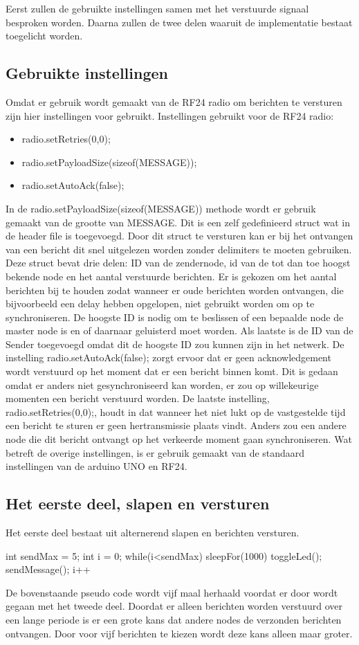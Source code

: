 \documentclass{article}
\begin{document}
Eerst zullen de gebruikte instellingen samen met het verstuurde signaal besproken worden. Daarna zullen de twee delen waaruit de implementatie bestaat toegelicht worden. 

\subsection{Gebruikte instellingen}
Omdat er gebruik wordt gemaakt van de RF24 radio om berichten te versturen zijn hier instellingen voor gebruikt. 
Instellingen gebruikt voor de RF24 radio:
\begin{itemize}
  \item radio.setRetries(0,0);
  \item radio.setPayloadSize(sizeof(MESSAGE));
  \item radio.setAutoAck(false);
\end{itemize}

In de radio.setPayloadSize(sizeof(MESSAGE)) methode wordt er gebruik gemaakt van de grootte van MESSAGE. Dit is een zelf gedefinieerd struct wat in de header file is toegevoegd. Door dit struct te versturen kan er bij het ontvangen van een bericht dit snel uitgelezen worden zonder delimiters te moeten gebruiken. Deze struct bevat drie delen: ID van de zendernode, id van de tot dan toe hoogst bekende node en het aantal verstuurde berichten. 
Er is gekozen om  het aantal berichten bij te houden zodat wanneer er oude berichten worden ontvangen, die bijvoorbeeld een delay hebben opgelopen, niet gebruikt worden om op te synchroniseren. 
De hoogste ID is nodig om te beslissen of een bepaalde node de master node is en of daarnaar geluisterd moet worden. 
Als laatste is de ID van de Sender toegevoegd omdat dit de hoogste ID zou kunnen zijn in het netwerk. 
De instelling radio.setAutoAck(false); zorgt ervoor dat er geen acknowledgement wordt verstuurd op het moment dat er een bericht binnen komt. Dit is gedaan omdat er anders niet gesynchroniseerd kan worden, er zou op willekeurige momenten een bericht verstuurd worden. 
De laatste instelling, radio.setRetries(0,0);, houdt in dat wanneer het niet lukt op de vastgestelde tijd een bericht te sturen er geen hertransmissie plaats vindt. Anders zou een andere node die dit bericht ontvangt op het verkeerde moment gaan synchroniseren. 
Wat betreft de overige instellingen, is er gebruik gemaakt van de standaard instellingen van de arduino UNO en RF24.

\subsection{Het eerste deel, slapen en versturen}
Het eerste deel bestaat uit alternerend slapen en berichten versturen. 
\begin{verbatimtab}
int sendMax = 5;
int i = 0;
while(i<sendMax)
	sleepFor(1000)
	toggleLed();
	sendMessage();
	i++
\end{verbatimtab}
De bovenstaande pseudo code wordt vijf maal herhaald voordat er door wordt gegaan met het tweede deel.
Doordat er alleen berichten worden verstuurd over een lange periode is er een grote kans dat andere nodes de verzonden berichten ontvangen. Door voor vijf berichten te kiezen wordt deze kans alleen maar groter.
\end{document}
